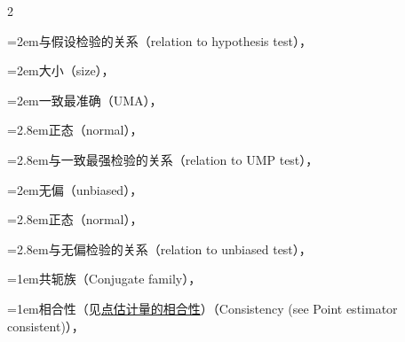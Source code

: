 \begin{multicols}{2}
\par\noindent\hangindent=2em\hspace*{1em}\label{idx:187}与假设检验的关系（relation to hypothesis test），\hyperref[thm:9.2.2]{\pageref*{thm:9.2.2}}\par
{}
\par\noindent\hangindent=2em\hspace*{1em}\label{idx:188}大小（size），\hyperref[idxocc:188:387]{\pageref*{idxocc:188:387}}\par
\par\noindent\hangindent=2em\hspace*{1em}\label{idx:189}一致最准确（UMA），\hyperref[idxocc:189:391]{\pageref*{idxocc:189:391}}\par
\par\noindent\hangindent=2.8em\hspace*{1.8em}\label{idx:190}正态（normal），\hyperref[ex:9.3.6]{\pageref*{ex:9.3.6}}\par
\par\noindent\hangindent=2.8em\hspace*{1.8em}\label{idx:191}与一致最强检验的关系（relation to UMP test），\hyperref[thm:9.3.5]{\pageref*{thm:9.3.5}}\par
\par\noindent\hangindent=2em\hspace*{1em}\label{idx:192}无偏（unbiased），\hyperref[def:9.3.7]{\pageref*{def:9.3.7}}\par
\par\noindent\hangindent=2.8em\hspace*{1.8em}\label{idx:193}正态（normal），\hyperref[ex:9.3.8]{\pageref*{ex:9.3.8}}\par
\par\noindent\hangindent=2.8em\hspace*{1.8em}\label{idx:194}与无偏检验的关系（relation to unbiased test），\hyperref[idxocc:194:392]{\pageref*{idxocc:194:392}}\par
\par\addvspace{2pt}
\par\noindent\hangindent=1em\hspace*{0em}\label{idx:195}共轭族（Conjugate family），\hyperref[def:7.2.15]{\pageref*{def:7.2.15}}\par
\par\addvspace{2pt}
\par\noindent\hangindent=1em\hspace*{0em}\label{idx:196}相合性（见\hyperref[idx:770]{点估计量的相合性}）（Consistency (see Point estimator consistent)），\hyperref[ex:5.5.3]{\pageref*{ex:5.5.3}}\par

\end{multicols}
